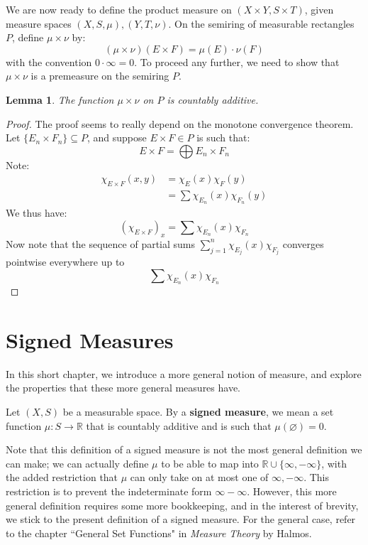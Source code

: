 \documentclass[a4paper,12pt]{report}
\newcommand{\sse} {\subseteq}
\newtheorem{lemma}[theorem]{Lemma}
\newenvironment{definition}[1][Definition.]{\begin{trivlist}
\item[\hskip \labelsep {\bfseries #1}]}{\end{trivlist}}
\begin{document}
	\noindent We are now ready to define the product measure on $(X \times Y, S \times T)$, given measure spaces $(X, S, \mu), (Y, T, \nu)$. On the semiring of measurable rectangles $P$, define $\mu \times \nu$ by:
	\[ (\mu \times \nu)(E \times F) = \mu(E) \cdot \nu(F) \]
	with the convention $0 \cdot \infty = 0$. To proceed any further, we need to show that $\mu \times \nu$ is a premeasure on the semiring $P$.
	
	\begin{lemma}
	The function $\mu \times \nu$ on $P$ is countably additive.
	\end{lemma}
	\begin{proof}
	The proof seems to really depend on the monotone convergence theorem. Let $\{E_n \times F_n\} \sse P$, and suppose $E \times F \in P$ is such that:
	\[ E \times F= \bigoplus E_n \times F_n \]
	Note:
	\begin{align*}
	\chi_{E \times F}(x, y) &= \chi_E(x) \chi_F(y) \\
	&= \sum \chi_{E_n}(x) \chi_{F_n}(y) 
	\end{align*}
	We thus have:
	\[ (\chi_{E \times F})_x = \sum \chi_{E_n}(x) \chi_{F_n} \]
	Now note that the sequence of partial sums $\sum_{j=1}^n \chi_{E_j}(x) \chi_{F_j}$ converges pointwise everywhere up to 
	\[ \sum \chi_{E_n}(x) \chi_{F_n} \]
	\end{proof}
	
	
	\chapter{Signed Measures}
	
	In this short chapter, we introduce a more general notion of measure, and explore the properties that these more general measures have. 
	
	\begin{definition}
	Let $(X, S)$ be a measurable space. By a \textbf{signed measure}, we mean a set function $\mu : S \rightarrow \mathbb{R}$ that is countably additive and is such that $\mu(\varnothing) = 0$.
	\end{definition}
	
	\noindent Note that this definition of a signed measure is not the most general definition we can make; we can actually define $\mu$ to be able to map into $\mathbb{R} \cup \{\infty, -\infty\}$, with the added restriction that $\mu$ can only take on at most one of $\infty, -\infty$. This restriction is to prevent the indeterminate form $\infty - \infty$. However, this more general definition requires some more bookkeeping, and in the interest of brevity, we stick to the present definition of a signed measure. For the general case, refer to the chapter ``General Set Functions" in \textit{Measure Theory} by Halmos.
	
\end{document}
